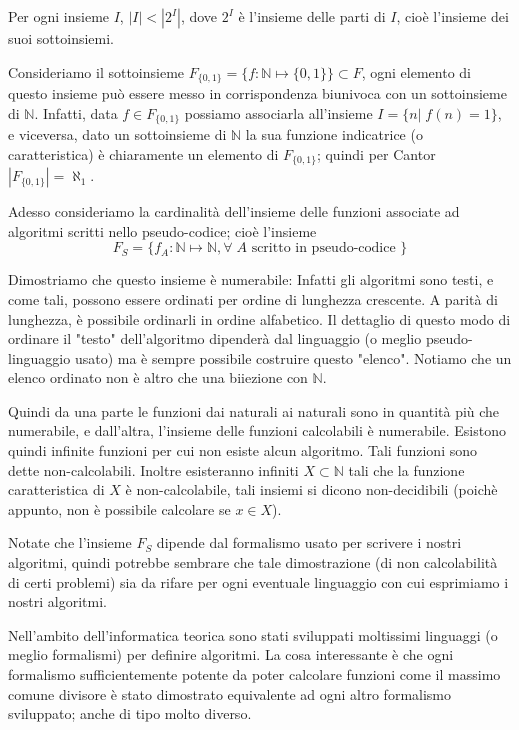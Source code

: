 \begin{thm} Per ogni insieme $I$, $|I| <
  |2^{I}|$, dove $2^I$ è l'insieme delle parti di $I$, cioè l'insieme
  dei suoi sottoinsiemi.
\end{thm}

Consideriamo il sottoinsieme $F_{\{0,1\}} = \{ f: \mathbb{N} \mapsto
\{0,1\} \} \subset F$, ogni elemento di questo insieme può essere
messo in corrispondenza biunivoca con un sottoinsieme di
$\mathbb{N}$. Infatti, data $f \in F_{\{0,1\}}$ possiamo associarla
all'insieme $I = \{ n |\; f(n) = 1 \}$, e viceversa, dato un
sottoinsieme di $\mathbb{N}$ la sua funzione indicatrice (o
caratteristica) è chiaramente un elemento di $F_{\{0,1\}}$; quindi per
Cantor $|F_{\{0,1\}}| = \aleph_1$.  \bigskip

Adesso consideriamo la cardinalità dell'insieme delle funzioni
associate ad algoritmi scritti nello pseudo-codice; cioè l'insieme
\[ F_S = \{ f_A: \mathbb{N} \mapsto \mathbb{N}, \forall\; A \mbox{ scritto in pseudo-codice }\}\]

Dimostriamo che questo insieme è numerabile: Infatti gli algoritmi
sono testi, e come tali, possono essere ordinati per ordine di
lunghezza crescente. A parità di lunghezza, è possibile ordinarli in
ordine alfabetico. Il dettaglio di questo modo di ordinare il "testo"
dell'algoritmo dipenderà dal linguaggio (o meglio pseudo-linguaggio
usato) ma è sempre possibile costruire questo "elenco". Notiamo che un
elenco ordinato non è altro che una biiezione con $\mathbb{N}$.

Quindi da una parte le funzioni dai naturali ai naturali sono in
quantità più che numerabile, e dall'altra, l'insieme delle funzioni
calcolabili è numerabile. Esistono quindi infinite funzioni per cui
non esiste alcun algoritmo. Tali funzioni sono dette
non-calcolabili. Inoltre esisteranno infiniti $X \subset \mathbb{N}$
tali che la funzione caratteristica di $X$ è non-calcolabile, tali
insiemi si dicono non-decidibili (poichè appunto, non è possibile
calcolare se $x \in X$).

Notate che l'insieme $F_S$ dipende dal formalismo usato per scrivere i
nostri algoritmi, quindi potrebbe sembrare che tale dimostrazione (di
non calcolabilità di certi problemi) sia da rifare per ogni eventuale
linguaggio con cui esprimiamo i nostri algoritmi.

Nell'ambito dell'informatica teorica sono stati sviluppati moltissimi
linguaggi (o meglio formalismi) per definire algoritmi. La cosa
interessante è che ogni formalismo sufficientemente potente da poter
calcolare funzioni come il massimo comune divisore è stato dimostrato
equivalente ad ogni altro formalismo sviluppato; anche di tipo molto
diverso.

